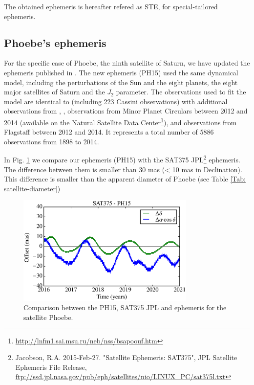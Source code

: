 \documentclass[useAMS,usenatbib]{mn2e}
\begin{document}
The obtained ephemeris is hereafter refered as STE, for special-tailored ephemeris.

\subsection{Phoebe's ephemeris}

For the specific case of Phoebe, the ninth satellite of Saturn, we have updated the ephemeris published in \cite{Desmars2013}. The new ephemeris (PH15) used the same dynamical model, including the perturbations of the Sun and the eight planets, the eight major satellites of Saturn and the $J_2$ parameter. The observations used to fit the model are identical to \cite{Desmars2013} (including 223 Cassini observations) with additional observations from \cite{GomesJunior2015}, \cite{Peng2015}, observations from Minor Planet Circulars between 2012 and 2014 (available on the Natural Satellite Data Center\footnote{\url{http://lnfm1.sai.msu.ru/neb/nss/bsapoouf.htm}}), and observations from Flagstaff \citep{NOFS} between 2012 and 2014. It represents a total number of 5886 observations from 1898 to 2014.

In Fig. \ref{Fig:eph-Phoebe} we compare our ephemeris (PH15) with the SAT375 JPL\footnote{Jacobson, R.A. 2015-Feb-27. "Satellite Ephemeris: SAT375", JPL Satellite Ephemeris File Release, \url{ftp://ssd.jpl.nasa.gov/pub/eph/satellites/nio/LINUX_PC/sat375l.txt}} ephemeris. The difference between them is smaller than 30 mas (< 10 mas in Declination). This difference is smaller than the apparent diameter of Phoebe (see Table \ref{Tab: satellite-diameter})

\begin{figure}
\begin{centering}
\includegraphics[width=8.8cm]{figures/Phoebe.eps} 
\caption{Comparison between the PH15, SAT375 JPL and \protect\cite{Emelyanov2007} ephemeris for the satellite Phoebe.}
\label{Fig:eph-Phoebe}
\end{centering}
\end{figure}
\end{document}
